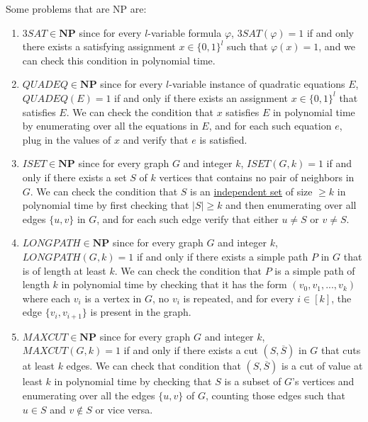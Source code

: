   Some problems that are NP are: 
  \begin{enumerate}
      \item $3SAT \in \mathbf{NP}$ since for every $l$-variable formula $\varphi$, $3SAT(\varphi) = 1$ if and only there exists a satisfying assignment $x \in \{0,1\}^l$ such that $\varphi(x) = 1$, and we can check this condition in polynomial time. 
      \item $QUADEQ \in \mathbf{NP}$ since for every $l$-variable instance of quadratic equations $E$, $QUADEQ (E) = 1$ if and only if there exists an assignment $x \in \{0,1\}^l$ that satisfies $E$. We can check the condition that $x$ satisfies $E$ in polynomial time by enumerating over all the equations in $E$, and for each such equation $e$, plug in the values of $x$ and verify that $e$ is satisfied. 
      \item $ISET \in \mathbf{NP}$ since for every graph $G$ and integer $k$, $ISET(G, k) = 1$ if and only if there exists a set $S$ of $k$ vertices that contains no pair of neighbors in $G$. We can check the condition that $S$ is an \hyperref[def:independent-set]{independent set} of size $\geq k$ in polynomial time by first checking that $|S| \geq k$ and then enumerating over all edges $\{u, v\}$ in $G$, and for each such edge verify that either $u \neq S$ or $v \neq S$. 
      \item $LONGPATH \in \mathbf{NP}$ since for every graph $G$ and integer $k$, $LONGPATH(G, k) = 1$ if and only if there exists a simple path $P$ in $G$ that is of length at least $k$. We can check the condition that $P$ is a simple path of length $k$ in polynomial time by checking that it has the form $(v_0, v_1, ..., v_k)$ where each $v_i$ is a vertex in $G$, no $v_i$ is repeated, and for every $i \in [k]$, the edge $\{v_i, v_{i+1}\}$ is present in the graph. 
      \item $MAXCUT \in \mathbf{NP}$ since for every graph $G$ and integer $k$, $MAXCUT (G, k) = 1$ if and only if there exists a cut $(S, \overline{S})$ in $G$ that cuts at least $k$ edges. We can check that condition that $(S, \overline{S})$ is a cut of value at least $k$ in polynomial time by checking that $S$ is a subset of $G$'s vertices and enumerating over all the edges $\{u, v\}$ of $G$, counting those edges such that $u \in S$ and $v \not\in S$ or vice versa. 
  \end{enumerate}


